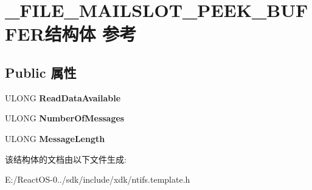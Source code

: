 \hypertarget{struct___f_i_l_e___m_a_i_l_s_l_o_t___p_e_e_k___b_u_f_f_e_r}{}\section{\+\_\+\+F\+I\+L\+E\+\_\+\+M\+A\+I\+L\+S\+L\+O\+T\+\_\+\+P\+E\+E\+K\+\_\+\+B\+U\+F\+F\+E\+R结构体 参考}
\label{struct___f_i_l_e___m_a_i_l_s_l_o_t___p_e_e_k___b_u_f_f_e_r}
\subsection*{Public 属性}
\begin{DoxyCompactItemize}
\item 
\mbox{\label{struct___f_i_l_e___m_a_i_l_s_l_o_t___p_e_e_k___b_u_f_f_e_r_afcd6ebdd968e89c6774615cf4e78826a}} 
U\+L\+O\+NG {\bfseries Read\+Data\+Available}
\item 
\mbox{\label{struct___f_i_l_e___m_a_i_l_s_l_o_t___p_e_e_k___b_u_f_f_e_r_a6d755d97a8ba68b9f6e8a6c079401bf4}} 
U\+L\+O\+NG {\bfseries Number\+Of\+Messages}
\item 
\mbox{\label{struct___f_i_l_e___m_a_i_l_s_l_o_t___p_e_e_k___b_u_f_f_e_r_ac6e949fcb8cc40cbd04dd93a4799abf3}} 
U\+L\+O\+NG {\bfseries Message\+Length}
\end{DoxyCompactItemize}


该结构体的文档由以下文件生成\+:\begin{DoxyCompactItemize}
\item 
E\+:/\+React\+O\+S-\/0../sdk/include/xdk/ntifs.\+template.\+h\end{DoxyCompactItemize}
